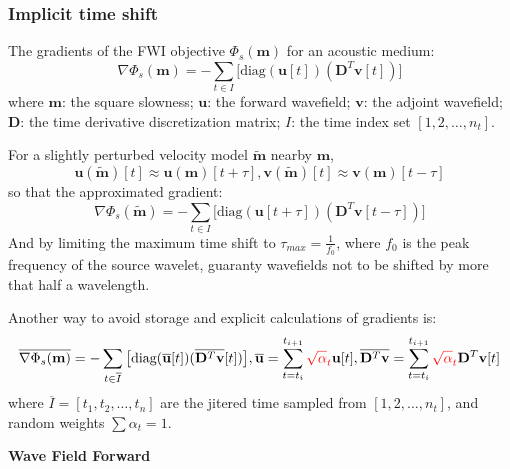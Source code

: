 \documentclass{article}
\renewcommand{\part}[1]{{\LARGE\bf\noindent #1}}
\newcommand{\prf}{This is relative path from \Papth to the paper file}
\newcommand{\pmk}{This is the brief info.}
\newcommand{\pti}{This is the paper tile}
\newcommand{\pay}{These are authors and year}
\newcommand{\pjo}{This is the journal}
\newcommand{\pda}{This is the date}
\newcommand{\mbf}[1]{\mathbf{#1}}
\newcommand{\mynno}[1]{{\color{red}#1}}
\newcommand{\npart}{\newpage\setcounter{footnote}{0}}
\begin{document}
\subsubsection{Implicit time shift}
The gradients of the FWI objective $\Phi_s(\mbf m)$ for an acoustic medium:
\[ \nabla\Phi_s(\mbf m)=-\sum_{t\in I}\big[\text{diag}(\mbf u[t])(\mbf D^T\mbf v[t])\big] \]
where $\mbf m$: the square slowness; $\mbf u$: the forward wavefield; $\mbf v$: the adjoint wavefield; $\mbf D$: the time derivative discretization matrix; $I$: the time index set $[1,2,\ldots,n_t]$.\par
For a slightly perturbed velocity model $\tilde{\mbf m}$ nearby $\mbf m$,
\[ \mbf u(\tilde{\mbf m})[t]\approx\mbf u(\mbf m)[t+\tau],\mbf v(\tilde{\mbf m})[t]\approx\mbf v(\mbf m)[t-\tau] \]
so that the approximated gradient:
\[ \nabla\Phi_s(\tilde{\mbf m})=-\sum_{t\in I}\big[\text{diag}(\mbf u[t+\tau])(\mbf D^T\mbf v[t-\tau])\big] \]
And by limiting the maximum time shift to $\tau_{max}=\frac{1}{f_0}$, where $f_0$ is the peak frequency of the source wavelet, guaranty wavefields not to be shifted by more that half a wavelength.\par
Another way to avoid storage and explicit calculations of gradients is:
\[ \overline{\nabla\Phi_s(\mbf m)}=-\sum_{t\in\overline I}\big[\text{diag}(\overline{\mbf u}[t])(\overline{\mbf D^T\mbf v}[t])\big],\overline{\mbf u}=\sum_{t=t_i}^{t_{i+1}}\mynno{\sqrt\alpha_t}\mbf u[t], \overline{\mbf D^T\mbf v}=\sum_{t=t_i}^{t_{i+1}}\mynno{\sqrt\alpha_t}\mbf D^T\mbf v[t] \]
where $\overline I=[t_1,t_2,\ldots,t_n]$ are the jitered time sampled from $[1,2,\ldots,n_t]$, and random weights $\sum\alpha_t=1$.\par







\npart
\part{Wave Field Forward}

\renewcommand{\pmk}{ZhangW\_2006\_GJI\_Traction image method}
\renewcommand{\prf}{WaveForward/\pmk.pdf}
\renewcommand{\pti}{Traction image method for irregular free surface boundaries in finite difference seismic wave simulation}
\renewcommand{\pay}{Wei Zhang, Xiaofei Chen, 2006}
\renewcommand{\pjo}{Geophys. J. Int.}
\renewcommand{\pda}{2016/10/29 Sat.}
\end{document}
